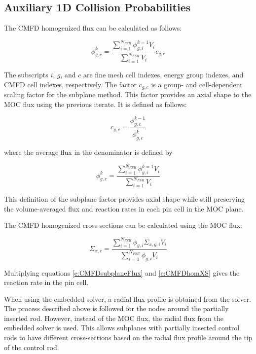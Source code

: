 \subsection{Auxiliary 1D Collision Probabilities}

The CMFD homogenized flux can be calculated as follows:

\begin{equation}\label{e:CMFDsubplaneFlux}
\phi^k_{g,c} = \frac{\sum_{i=1}^{N_{FSR}} \phi^{k=1}_{g,i} V_i}{\sum_{i=1}^{N_{FSR}} V_i} c_{g,c}
\end{equation}

The subscripts $i$, $g$, and $c$ are fine mesh cell indexes, energy group indexes, and CMFD cell indexes, respectively.  The factor $c_{g,c}$ is a group- and cell-dependent scaling factor for the subplane method.  This factor provides an axial shape to the MOC flux using the previous iterate.  It is defined as follows:

\begin{equation}\label{e:CMFDsubplaneFactor}
c_{g,c} = \frac{\phi^{k-1}_{g,c}}{\overline{\phi^k_{g,c}}}
\end{equation}

where the average flux in the denominator is defined by

\begin{equation}\label{e:CMFDaverageFlux}
\phi^k_{g,c} = \frac{\sum_{i=1}^{N_{FSR}} \phi^{k=1}_{g,i} V_i}{\sum_{i=1}^{N_{FSR}} V_i}
\end{equation}

This definition of the subplane factor provides axial shape while still preserving the volume-averaged flux and reaction rates in each pin cell in the MOC plane.

The CMFD homogenized cross-sections can be calculated using the MOC flux:

\begin{equation}\label{e:CMFDhomXS}
\Sigma_{x,c} = \frac{\sum_{i=1}^{N_{FSR}} \phi_{g,i}\Sigma_{x,g,i}V_i}{\sum_{i=1}^{N_{FSR}} \phi_{g,i}V_i}
\end{equation}

Multiplying equations \ref{e:CMFDsubplaneFlux} and \ref{e:CMFDhomXS} gives the reaction rate in the pin cell.

When using the embedded solver, a radial flux profile is obtained from the solver.  The process described above is followed for the nodes around the partially inserted rod.  However, instead of the MOC flux, the radial flux from the embedded solver is used.  This allows subplanes with partially inserted control rods to have different cross-sections based on the radial flux profile around the tip of the control rod.

